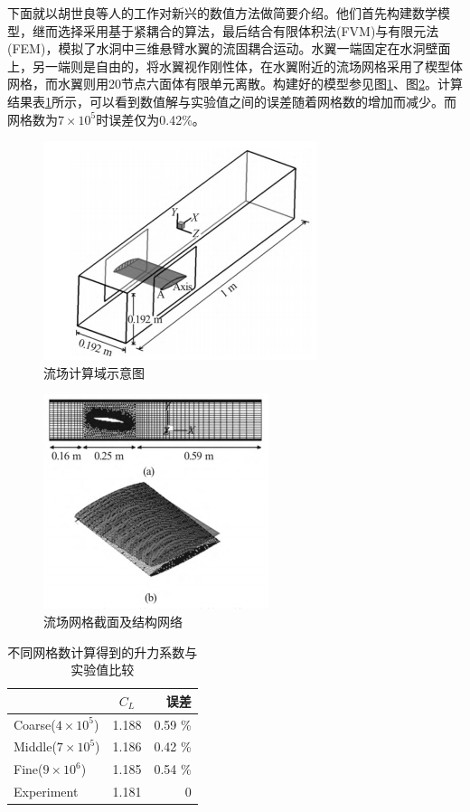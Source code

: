 \documentclass[10.5pt,twocolumn]{jbuaa}
\begin{document}
下面就以胡世良等人\cite{hu}的工作对新兴的数值方法做简要介绍。他们首先构建数学模型，继而选择采用基于紧耦合的算法，最后结合有限体积法(FVM)与有限元法(FEM)，模拟了水洞中三维悬臂水翼的流固耦合运动。水翼一端固定在水洞壁面上，另一端则是自由的，将水翼视作刚性体，在水翼附近的流场网格采用了楔型体网格，而水翼则用20节点六面体有限单元离散。构建好的模型参见图\ref{fig:cfd1}、图\ref{fig:cfd2}。计算结果表\ref{tab:1}所示，可以看到数值解与实验值之间的误差随着网格数的增加而减少。而网格数为$7 \times 1{0^5}$时误差仅为0.42\%。
\begin{figure}
	\centering
	\includegraphics[scale=1,trim=0 0 0 0]{image/cfd1}
	\caption{流场计算域示意图}
	\label{fig:cfd1}
\end{figure}
\begin{figure}
	\centering
	\includegraphics[scale=1,trim=0 0 0 0]{image/cfd2}
	\caption{流场网格截面及结构网络}
	\label{fig:cfd2}
\end{figure}

\begin{table}[h]
	\centering
	\begin{tabular}{l c r}
		\hline
		& $C_L$ & 误差\\
		\hline
		Coarse($4 \times 1{0^5}$) & 1.188 & 0.59 \% \\
		\hline
		Middle($7 \times 1{0^5}$) & 1.186 & 0.42 \% \\
		\hline
		Fine($9 \times 1{0^6} $) & 1.185 & 0.54 \% \\
		\hline
		Experiment & 1.181 & 0\\
		\hline
	\end{tabular}
	\caption{不同网格数计算得到的升力系数与实验值比较}
	\label{tab:1}
\end{table}
\end{document}
